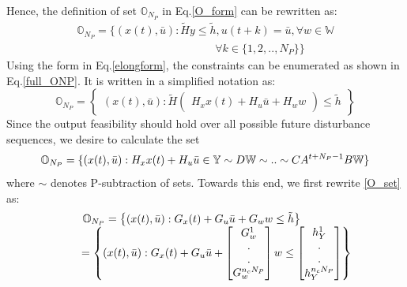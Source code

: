 \documentclass[letterpaper, 10 pt, conference]{ieeeconf}  %
\begin{document}
  \fi
  Hence, the definition of set $\mathbb{O}_{N_P}$ in Eq.\eqref{O_form} can be rewritten as:
   \begin{equation}
   \begin{matrix}
   \mathbb{O}_{N_P} = \{(x(t),\bar{u}):\tilde{H}y\leq \tilde{h},  u(t+k)=\bar{u},\forall w \in \mathbb{W}  \\ \hspace{150pt} \forall k \in \{1,2,..,N_P\} \}
   \end{matrix}
   \label{O_form}
   \end{equation}
Using the form in  Eq.\eqref{elongform}, the constraints can be enumerated as shown in Eq.\eqref{full_ONP}. It is written in a simplified notation as:
\begin{equation}
\mathbb{O}_{N_P}= \begin{Bmatrix}
(x(t),\bar{u}):
\tilde{H}
\begin{pmatrix}
H_xx(t) +
H_u\bar{u} +  
H_w
w
\end{pmatrix}
\leq
\tilde{h}
\end{Bmatrix}
\label{O_set}
\end{equation}
Since the output feasibility should hold over all possible future disturbance sequences, we desire to calculate the set
\begin{equation}
\small
\mathbb{O}_{N_P}=\{(x(t),\bar{u}): 	H_xx(t) +
H_u\bar{u}\in \mathbb{Y} \sim D\mathbb{W} \sim .. \sim CA^{t+N_P-1}B\mathbb{W}  \}
\label{Minkowski}
\end{equation}
where $\sim$ denotes P-subtraction of sets. Towards this end, we first rewrite \eqref{O_set} as: 
  \begin{equation}
  \small
  \begin{matrix}
  \hspace{-25pt}
  \mathbb{O}_{N_P}= \begin{Bmatrix}
  (x(t),\bar{u}):
  G_x(t) +
  G_u\bar{u} +  
  G_w
  w
  \leq
  \tilde{h}
  \end{Bmatrix}
  \\
  \hspace{20pt}
 = \begin{Bmatrix}
  (x(t),\bar{u}):
	G_x(t) +
  G_u\bar{u} +  
  \begin{bmatrix}
  G^1_w \\ . \\ . \\ G^{n_cN_P}_w
  \end{bmatrix}
  w
  \leq
  \begin{bmatrix}
  h_Y^1 \\ . \\ . \\ h_Y^{n_cN_P}
  \end{bmatrix}
  \end{Bmatrix}
  \end{matrix}
  \end{equation}
\end{document}

